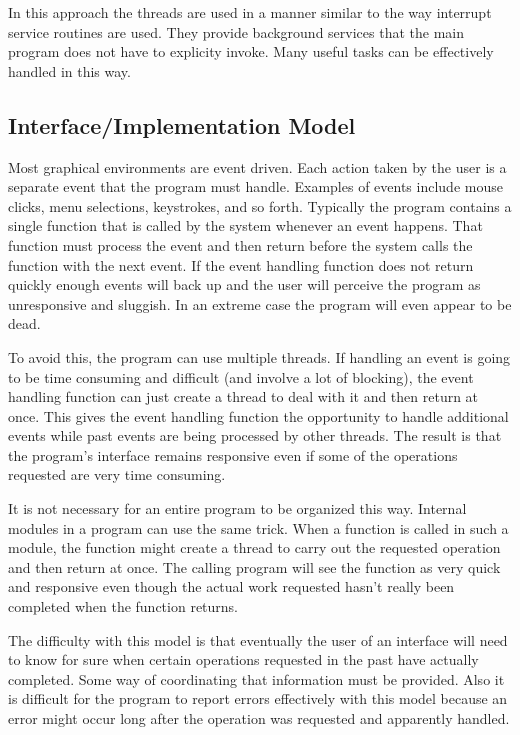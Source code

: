 In this approach the threads are used in a manner similar to the way interrupt service routines
are used. They provide background services that the main program does not have to explicity
invoke. Many useful tasks can be effectively handled in this way.

\subsection{Interface/Implementation Model}
\label{subsec:interface-model}

Most graphical environments are event driven. Each action taken by the user is a separate event
that the program must handle. Examples of events include mouse clicks, menu selections,
keystrokes, and so forth. Typically the program contains a single function that is called by the
system whenever an event happens. That function must process the event and then return before
the system calls the function with the next event. If the event handling function does not
return quickly enough events will back up and the user will perceive the program as unresponsive
and sluggish. In an extreme case the program will even appear to be dead.

To avoid this, the program can use multiple threads. If handling an event is going to be time
consuming and difficult (and involve a lot of blocking), the event handling function can just
create a thread to deal with it and then return at once. This gives the event handling function
the opportunity to handle additional events while past events are being processed by other
threads. The result is that the program's interface remains responsive even if some of the
operations requested are very time consuming.

It is not necessary for an entire program to be organized this way. Internal modules in a
program can use the same trick. When a function is called in such a module, the function might
create a thread to carry out the requested operation and then return at once. The calling
program will see the function as very quick and responsive even though the actual work requested
hasn't really been completed when the function returns.

The difficulty with this model is that eventually the user of an interface will need to know for
sure when certain operations requested in the past have actually completed. Some way of
coordinating that information must be provided. Also it is difficult for the program to report
errors effectively with this model because an error might occur long after the operation was
requested and apparently handled.

